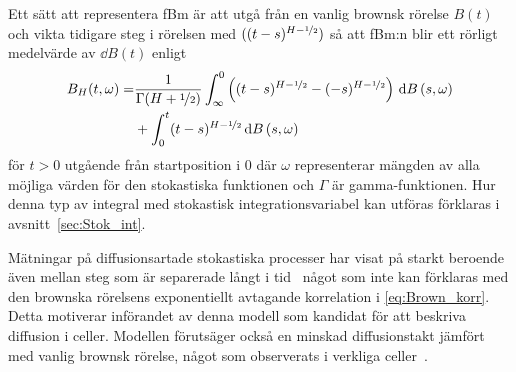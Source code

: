 Ett sätt att representera fBm är att utgå från en vanlig brownsk rörelse $B(t)$ och vikta tidigare steg i rörelsen med $((t-s)^{H-\nicefrac{1}{2}})$  så att fBm:n blir ett rörligt medelvärde av $\dd{B}(t)$ enligt \cite{Mandelbrot_fBm1968}
\begin{equation} \label{eq:fBm_repr}
\begin{aligned}
    B_H(t,\omega)=& \frac{1}{\Gamma(H+\nicefrac{1}{2})} 
    \int_{\infty}^0 \left( (t-s)^{H-\nicefrac{1}{2}}-(-s)^{H-\nicefrac{1}{2}}\right)\,\dd{B}(s,\omega) \\
    &+ \int_0^t (t-s)^{H-\nicefrac{1}{2}} \dd{B}(s,\omega)
\end{aligned}
\end{equation}
för $t>0$ utgående från startposition i 0 där $\omega$ representerar mängden av alla möjliga värden för den stokastiska funktionen och $\Gamma$ är gamma-funktionen. Hur denna typ av integral med stokastisk integrationsvariabel kan utföras förklaras i avsnitt~\ref{sec:Stok_int}.


Mätningar på diffusionsartade stokastiska processer har visat på starkt beroende även mellan steg som är separerade långt i tid~\cite{Mandelbrot_fBm1968} något som inte kan förklaras med den brownska rörelsens exponentiellt avtagande korrelation i \eqref{eq:Brown_korr}. Detta motiverar införandet av denna modell som kandidat för att beskriva   diffusion i celler. Modellen förutsäger också en minskad diffusionstakt jämfört med vanlig brownsk rörelse, något som observerats i verkliga celler~\cite{Hofling&Franosch2013}.

